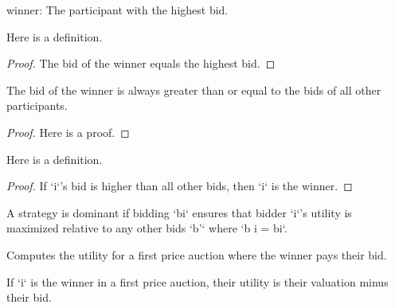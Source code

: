 \begin{definition}\label{winner}
    \leanok
    winner: The participant with the highest bid.
\end{definition}

\begin{lemma}\label{bid_winner_eq_maxBid}
    \leanok
    Here is a definition.
\end{lemma}
\begin{proof}
    The bid of the winner equals the highest bid.
\end{proof}

\begin{lemma}\label{bid_le_bid_winner}
    \leanok
    The bid of the winner is always greater than or equal to the bids of all other participants.
\end{lemma}
\begin{proof}
    Here is a proof.
\end{proof}

\begin{lemma}\label{eq_winner_of_bid_gt}
    \leanok
    Here is a definition.
\end{lemma}
\begin{proof}
    If `i`'s bid is higher than all other bids, then `i` is the winner.
\end{proof}

\begin{definition}\label{dominant}
    \leanok
    A strategy is dominant if bidding `bi` ensures that bidder `i`'s utility is maximized relative to any other bids `b'` where `b i = bi`.
\end{definition}

\begin{definition}\label{FirstPrice.utility}
    \leanok
    Computes the utility for a first price auction where the winner pays their bid.
\end{definition}

\begin{lemma}\label{FirstPrice.utility_winner}
    \leanok
    If `i` is the winner in a first price auction, their utility is their valuation minus their bid.
\end{lemma}


